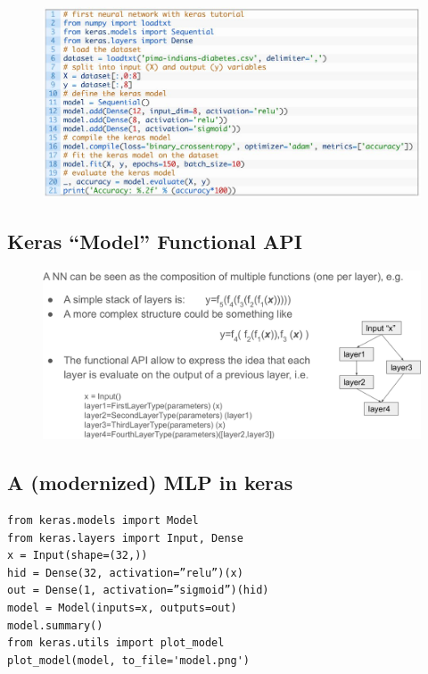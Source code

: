 \begin{figure}[ht]
	\centering
	\includegraphics[width=0.8\linewidth]{figure_ml/seq_ex.png}
\end{figure}
\FloatBarrier
\subsection{Keras “Model” Functional API}

\begin{figure}[ht]
	\centering
	\includegraphics[width=1\linewidth]{figure_ml/keras_model.png}
\end{figure}
\FloatBarrier

\subsection{A (modernized) MLP in keras}

\begin{verbatim}
from keras.models import Model
from keras.layers import Input, Dense
x = Input(shape=(32,))
hid = Dense(32, activation=”relu”)(x)
out = Dense(1, activation=”sigmoid”)(hid)
model = Model(inputs=x, outputs=out)
model.summary()
from keras.utils import plot_model
plot_model(model, to_file='model.png')
\end{verbatim}

